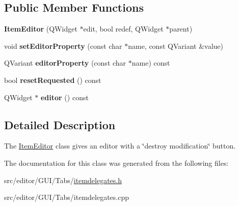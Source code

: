 \subsection*{\-Public \-Member \-Functions}
\begin{DoxyCompactItemize}
\item 
\hypertarget{class_item_editor_a9ca5d5d8d4ae77e378d069c57dc18ba5}{{\bfseries \-Item\-Editor} (\-Q\-Widget $\ast$edit, bool redef, \-Q\-Widget $\ast$parent)}\label{class_item_editor_a9ca5d5d8d4ae77e378d069c57dc18ba5}

\item 
\hypertarget{class_item_editor_a71ede1af77c2de8f7d1229ccada47f9a}{void {\bfseries set\-Editor\-Property} (const char $\ast$name, const \-Q\-Variant \&value)}\label{class_item_editor_a71ede1af77c2de8f7d1229ccada47f9a}

\item 
\hypertarget{class_item_editor_a782c5756b983fc5993ad65636d4737c5}{\-Q\-Variant {\bfseries editor\-Property} (const char $\ast$name) const }\label{class_item_editor_a782c5756b983fc5993ad65636d4737c5}

\item 
\hypertarget{class_item_editor_ac1ef2ff64a85a0cf7e03483d4c256ee1}{bool {\bfseries reset\-Requested} () const }\label{class_item_editor_ac1ef2ff64a85a0cf7e03483d4c256ee1}

\item 
\hypertarget{class_item_editor_a59d16e179b2526834559467e752e8db0}{\-Q\-Widget $\ast$ {\bfseries editor} () const }\label{class_item_editor_a59d16e179b2526834559467e752e8db0}

\end{DoxyCompactItemize}


\subsection{\-Detailed \-Description}
\-The \hyperlink{class_item_editor}{\-Item\-Editor} class gives an editor with a \char`\"{}destroy modification\char`\"{} button. 

\-The documentation for this class was generated from the following files\-:\begin{DoxyCompactItemize}
\item 
src/editor/\-G\-U\-I/\-Tabs/\hyperlink{itemdelegates_8h}{itemdelegates.\-h}\item 
src/editor/\-G\-U\-I/\-Tabs/itemdelegates.\-cpp\end{DoxyCompactItemize}
